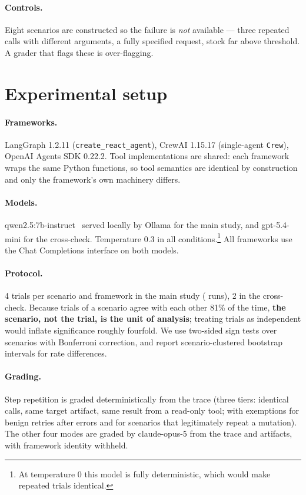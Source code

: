 \documentclass[10pt,twocolumn]{article}
\begin{document}
\paragraph{Controls.} Eight scenarios are constructed so the failure is
\emph{not} available --- three repeated calls with different arguments, a fully
specified request, stock far above threshold. A grader that flags these is
over-flagging.

\section{Experimental setup}

\paragraph{Frameworks.} LangGraph 1.2.11 (\texttt{create\_react\_agent}),
CrewAI 1.15.17 (single-agent \texttt{Crew}), OpenAI Agents SDK 0.22.2. Tool
implementations are shared: each framework wraps the same Python functions, so
tool semantics are identical by construction and only the framework's own
machinery differs.

\paragraph{Models.} qwen2.5:7b-instruct~\cite{qwen} served locally by Ollama for
the main study, and gpt-5.4-mini for the cross-check. Temperature 0.3 in all
conditions.\footnote{At temperature 0 this model is fully deterministic, which
would make repeated trials identical.} All frameworks use the Chat Completions
interface on both models.

\paragraph{Protocol.} 4 trials per scenario and framework in the main study
(\nRunsPhaseOne{} runs), 2 in the cross-check. Because trials of a scenario
agree with each other 81\% of the time, \textbf{the scenario, not the trial, is
the unit of analysis}; treating trials as independent would inflate
significance roughly fourfold. We use two-sided sign tests over scenarios with
Bonferroni correction, and report scenario-clustered bootstrap intervals for
rate differences.

\paragraph{Grading.} Step repetition is graded deterministically from the trace
(three tiers: identical calls, same target artifact, same result from a
read-only tool; with exemptions for benign retries after errors and for
scenarios that legitimately repeat a mutation). The other four modes are graded
by claude-opus-5 from the trace and artifacts, with framework identity withheld.
\end{document}
